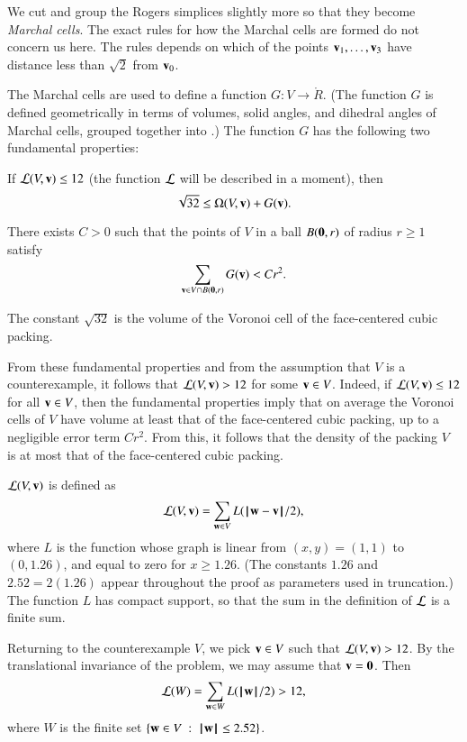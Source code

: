 We cut and group the Rogers simplices slightly more so that they
become {\it Marchal cells}.  The exact rules for how the Marchal cells
are formed do not concern us here.  The rules depends on which of the
points ${\mathbf v}_1,\ldots,{\mathbf v}_3$ have distance less than $\sqrt2$ from
${\mathbf v}_0$.

The Marchal cells are used to define a function $G:V\to \ring{R}$.
(The function $G$ is defined geometrically in terms of volumes, solid
angles, and dihedral angles of Marchal cells, grouped together into
.)  The function $G$ has the following two
fundamental properties:
\begin{description}
\item {} If ${\mathcal L}(V,{\mathbf v})\le 12$ 
(the function ${\mathcal L}$ will be described in a moment), then 
\[
\sqrt{32}\le \Omega(V,{\mathbf v}) +G({\mathbf v}).
\]
\item {}   There exists $C>0$ such that the points of $V$ in a ball $B({\mathbf 0},r)$
of radius $r\ge 1$ satisfy
\[
\sum_{{\mathbf v}\in V \cap B({\mathbf 0},r)} G({\mathbf v}) < C r^2.
\]
\end{description}
The constant $\sqrt{32}$ is the volume of the Voronoi cell of the face-centered cubic packing.

From these fundamental properties and from the assumption that $V$ is a counterexample,
it follows that ${\mathcal L}(V,{\mathbf v})>12$ for some ${\mathbf v}\in V$.  Indeed, if ${\mathcal L}(V,{\mathbf v})\le 12$ for all
${\mathbf v}\in V$, then the fundamental properties
imply that on average the Voronoi cells of $V$ have volume at least that of the face-centered
cubic packing, up to a negligible error term $C r^2$.  From this, it follows that the density
of the packing $V$ is at most that of the face-centered cubic packing.

 ${\mathcal L}(V,{\mathbf v})$ is defined as
\[
\CalL(V,\v) = \sum_{\w\in V} L(\norm{\w}{\v}/2),
\]
where $L$ is the function whose graph is linear from $(x,y)=(1,1)$ to $(0,1.26)$, and equal
to zero for $x\ge 1.26$.  (The constants $1.26$ and $2.52=2(1.26)$ appear throughout the
proof as parameters used in truncation.)   
The function $L$ has compact support, so that the sum in the
definition of ${\mathcal L}$ is a finite sum.

Returning to the counterexample $V$, we pick ${\mathbf v}\in V$ such that
${\mathcal L}(V,{\mathbf v})>12$.  By the translational invariance of the problem, we
may assume that ${\mathbf v}={\mathbf 0}$.  Then
\begin{equation}\label{eqn:LW}
{\mathcal L}(W) = \sum_{{\mathbf w}\in W} L({{\hskip0.1em|\hskip-0.15em|\hskip0.1em}{\mathbf w}{\hskip0.1em|\hskip-0.15em|\hskip0.1em}}/2)  > 12,
\end{equation}
where $W$ is the finite set  $\{{\mathbf w}\in V\ :\  {{\hskip0.1em|\hskip-0.15em|\hskip0.1em}{\mathbf w}{\hskip0.1em|\hskip-0.15em|\hskip0.1em}} \le 2.52\}$.

